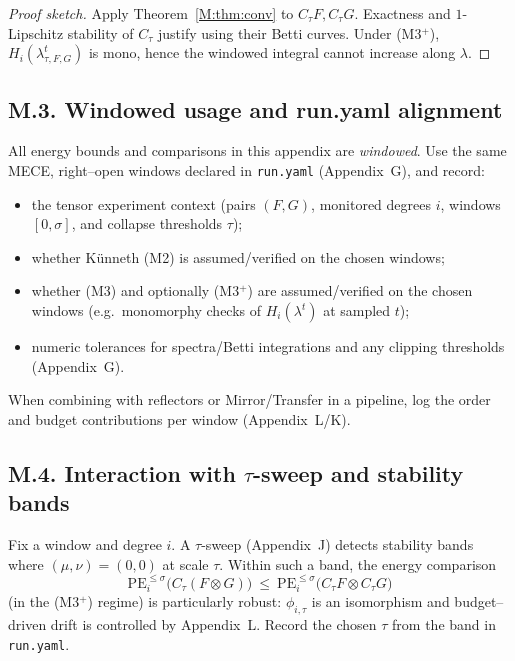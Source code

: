 \documentclass[11pt]{article}
\DeclareRobustCommand{\hyp}{\nobreakdash-}
\numberwithin{equation}{section}
\theoremstyle{definition}
\begin{document}
\begin{proof}[Proof sketch]
Apply Theorem~\ref{M:thm:conv} to \(C_\tau F,C_\tau G\). Exactness and \(1\)\hyp Lipschitz stability of \(C_\tau\) justify using their Betti curves. Under (M3$^{+}$), \(H_i(\lambda_{\tau,F,G}^t)\) is mono, hence the windowed integral cannot increase along \(\lambda\).
\end{proof}

\subsection*{M.3. Windowed usage and run.yaml alignment}
All energy bounds and comparisons in this appendix are \emph{windowed}. Use the same MECE, right–open windows declared in \texttt{run.yaml} (Appendix~G), and record:
\begin{itemize}\itemsep0.25em
  \item the tensor experiment context (pairs \((F,G)\), monitored degrees \(i\), windows \([0,\sigma]\), and collapse thresholds \(\tau\));
  \item whether Künneth (M2) is assumed/verified on the chosen windows;
  \item whether (M3) and optionally (M3$^{+}$) are assumed/verified on the chosen windows (e.g.\ monomorphy checks of \(H_i(\lambda^t)\) at sampled \(t\));
  \item numeric tolerances for spectra/Betti integrations and any clipping thresholds (Appendix~G).
\end{itemize}
When combining with reflectors or Mirror/Transfer in a pipeline, log the order and budget contributions per window (Appendix~L/K).

\subsection*{M.4. Interaction with $\tau$-sweep and stability bands}
Fix a window and degree \(i\). A \(\tau\)-sweep (Appendix~J) detects stability bands where \((\mu,\nu)=(0,0)\) at scale \(\tau\).
Within such a band, the energy comparison
\[
\mathrm{PE}_i^{\le \sigma}\!\big(C_\tau(F\otimes G)\big)\ \le\ \mathrm{PE}_i^{\le \sigma}\!\big(C_\tau F \otimes C_\tau G\big)
\]
(in the (M3$^{+}$) regime) is particularly robust: \(\phi_{i,\tau}\) is an isomorphism and budget–driven drift is controlled by Appendix~L. Record the chosen \(\tau\) from the band in \texttt{run.yaml}.
\end{document}
